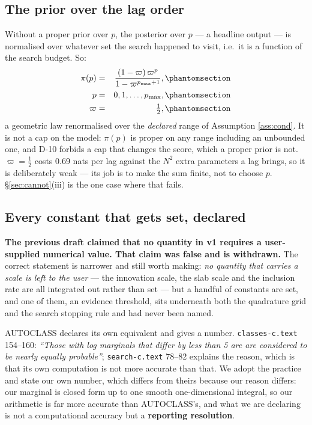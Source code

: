 \subsection{The prior over the lag order}\label{sec:lagprior}

Without a proper prior over $p$, the posterior over $p$ --- a headline output --- is
normalised over whatever set the search happened to visit, i.e.\ it is a function of
the search budget. So:
\begin{eqnarray}
\pi(p) &=& \frac{(1-\varpi)\,\varpi^{p}}{1-\varpi^{p_{\max}+1}},
  \Elabel{E-97A}{E97_A} \\
p &=& 0,1,\dots,p_{\max},
  \Elabel{E-97B}{E97_B} \\
\varpi &=& \tfrac12,
  \Elabel{E-97C}{E97_C}
\end{eqnarray}
a geometric law renormalised over the \emph{declared} range of Assumption
\ref{ass:cond}. It is not a cap on the model: $\pi(p)$ is proper on any range
including an unbounded one, and D-10 forbids a cap that changes the score, which a
proper prior is not. $\varpi=\frac12$ costs 0.69 nats per lag against the $N^2$ extra
parameters a lag brings, so it is deliberately weak --- its job is to make the sum
finite, not to choose $p$. \S\ref{sec:cannot}(iii) is the one case where that fails.

\subsection{Every constant that gets set, declared}\label{sec:constants}

\textbf{The previous draft claimed that no quantity in v1 requires a user-supplied
numerical value. That claim was false and is withdrawn.} The correct statement is
narrower and still worth making: \emph{no quantity that carries a scale is left to
the user} --- the innovation scale, the slab scale and the inclusion rate are all
integrated out rather than set --- but a handful of constants are set, and one of
them, an evidence threshold, sits underneath both the quadrature grid and the search
stopping rule and had never been named.

AUTOCLASS declares its own equivalent and gives a number.
\texttt{classes-c.text} 154--160: \emph{``Those with log marginals that differ by
less than 5 are are considered to be nearly equally probable''};
\texttt{search-c.text} 78--82 explains the reason, which is that its own computation
is not more accurate than that. We adopt the practice and state our own number, which
differs from theirs because our reason differs: our marginal is closed form up to one
smooth one-dimensional integral, so our arithmetic is far more accurate than
AUTOCLASS's, and what we are declaring is not a computational accuracy but a
\textbf{reporting resolution}.

